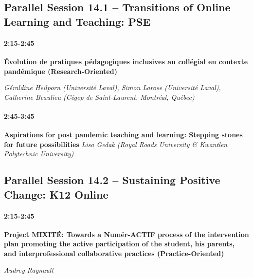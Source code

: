 \documentclass[
]{book}
\begin{document}
\hypertarget{parallel-session-14.1-transitions-of-online-learning-and-teaching-pse}{%
\subsection*{Parallel Session 14.1 -- Transitions of Online Learning and Teaching: PSE}\label{parallel-session-14.1-transitions-of-online-learning-and-teaching-pse}}

\begin{secondary}
\hypertarget{section}{%
\paragraph{2:15-2:45}\label{section}}

\textbf{Évolution de pratiques pédagogiques inclusives au collégial en
contexte pandémique (Research-Oriented)}

\emph{Géraldine Heilporn (Université Laval), Simon Larose (Université
Laval), Catherine Beaulieu (Cégep de Saint-Laurent, Montréal, Québec)}
\end{secondary}

\begin{secondary}
\hypertarget{section}{%
\paragraph{2:45-3:45}\label{section}}

\textbf{Aspirations for post pandemic teaching and learning: Stepping
stones for future possibilities} \emph{Lisa Gedak (Royal Roads
University \& Kwantlen Polytechnic University)}
\end{secondary}

\hypertarget{parallel-session-14.2-sustaining-positive-change-k12-online}{%
\subsection*{Parallel Session 14.2 -- Sustaining Positive Change: K12 Online}\label{parallel-session-14.2-sustaining-positive-change-k12-online}}

\begin{secondary}
\hypertarget{section}{%
\paragraph{2:15-2:45}\label{section}}

\textbf{Project MIXITÉ: Towards a Numér-ACTIF process of the
intervention plan promoting the active participation of the student, his
parents, and interprofessional collaborative practices
(Practice-Oriented)}

\emph{Audrey Raynault}
\end{secondary}
\end{document}
